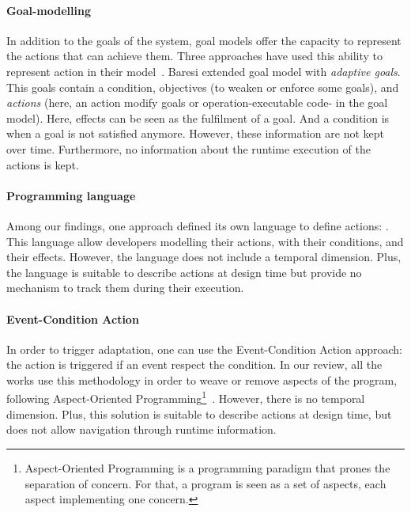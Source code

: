 \paragraph{Goal-modelling}
In addition to the goals of the system, goal models offer the capacity to represent the \glspl{action} that can achieve them.
Three approaches have used this ability to represent action in their model~\cite{DBLP:conf/icse/MendoncaAR14, DBLP:conf/iceccs/BencomoWSW12, DBLP:conf/re/BaresiPS10}.
Baresi \etal extended goal model with \textit{adaptive goals}.
This goals contain a condition, objectives (to weaken or enforce some goals), and \textit{actions} (here, an action modify goals or operation-executable code- in the goal model).
Here, effects can be seen as the fulfilment of a goal.
And a condition is when a goal is not satisfied anymore.
However, these information are not kept over time.
Furthermore, no information about the runtime execution of the actions is kept.
	
\paragraph{Programming language}
Among our findings, one approach defined its own language to define actions: \cite{DBLP:journals/jss/ChengG12}.
This language allow developers modelling their actions, with their conditions, and their effects.
However, the language does not include a temporal dimension.
Plus, the language is suitable to describe actions at design time but provide no mechanism to track them during their execution.
	
\paragraph{Event-Condition Action}
In order to trigger adaptation, one can use the Event-Condition Action approach: the action is triggered if an event respect the condition.
In our review, all the works use this methodology in order to weave or remove aspects of the program, following Aspect-Oriented Programming\footnote{Aspect-Oriented Programming is a programming paradigm that prones the separation of concern. For that, a program is seen as a set of aspects, each aspect implementing one concern.}~\cite{DBLP:conf/icws/CharfiDM09, DBLP:journals/scp/ParraBCD11, DBLP:conf/soco/DavidL06}.
However, there is no temporal dimension.
Plus, this solution is suitable to describe actions at design time, but does not allow navigation through runtime information.

